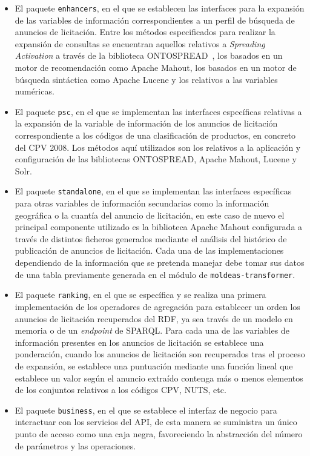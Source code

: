 \begin{itemize}
\item  El paquete \texttt{enhancers}, en el que se establecen las interfaces para la 
expansión de las variables de información correspondientes a un perfil de búsqueda 
de anuncios de licitación. Entre los métodos especificados para realizar la expansión 
de consultas se encuentran aquellos relativos a \textit{Spreading Activation} a través 
de la biblioteca ONTOSPREAD~\cite{ontospreadWSKS11}, los basados en un motor de recomendación como Apache Mahout,
 los basados en un motor de búsqueda sintáctica como Apache Lucene y los relativos 
a las variables numéricas. 

\item El paquete \texttt{psc}, en el que se implementan las interfaces específicas relativas 
a la expansión de la variable de información de los anuncios de licitación correspondiente 
a los códigos de una clasificación de productos, en concreto del CPV 2008. Los métodos aquí 
utilizados son los relativos a la aplicación y configuración de las bibliotecas ONTOSPREAD, 
Apache Mahout, Lucene y Solr.

\item El paquete \texttt{standalone}, en el que se implementan las interfaces específicas 
para otras variables de información secundarias como la información geográfica o la cuantía 
del anuncio de licitación, en este caso de nuevo el principal componente utilizado es la biblioteca 
Apache Mahout configurada a través de distintos ficheros generados mediante el análisis 
del histórico de publicación de anuncios de licitación. Cada una de las implementaciones 
dependiendo de la información que se pretenda manejar debe tomar sus datos de una tabla 
previamente generada en el módulo de \texttt{moldeas-transformer}.

\item El paquete \texttt{ranking}, en el que se específica y se realiza una primera implementación 
de los operadores de agregación para establecer un orden los anuncios de licitación recuperados 
del \dataset RDF, ya sea través de un modelo en memoria o de un \textit{endpoint} de SPARQL. Para cada 
una de las variables de información presentes en los anuncios de licitación se establece una ponderación, cuando 
los anuncios de licitación son recuperados tras el proceso de expansión, se establece una puntuación 
mediante una función lineal que establece un valor según el anuncio extraído contenga más o menos 
elementos de los conjuntos relativos a los códigos \gls{CPV}, \gls{NUTS}, etc.

\item El paquete \texttt{business}, en el que se establece el interfaz de negocio para interactuar con los servicios 
del API, de esta manera se suministra un único punto de acceso como una caja negra, favoreciendo la 
abstracción del número de parámetros y las operaciones.
\end{itemize}

